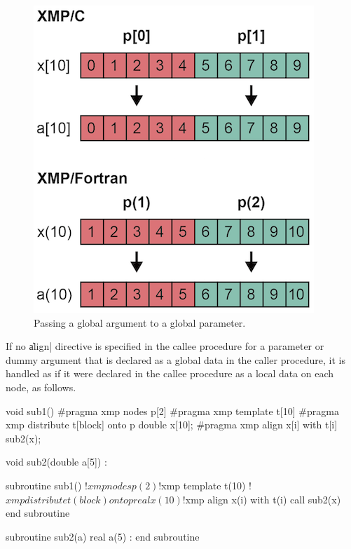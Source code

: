 \begin{figure}
  \centering
  \includegraphics{figs/destributed_array.png}
  \caption{Passing a global argument to a global parameter.}
\end{figure}


If no \|align| directive is specified in the callee procedure for a
parameter or dummy argument that is declared as a global data in the
caller procedure, it is handled as if it were declared in the callee
procedure as a local data on each node, as follows.

\begin{XCexample}
void sub1(){
#pragma xmp nodes p[2]
#pragma xmp template t[10]
#pragma xmp distribute t[block] onto p
  double x[10];
#pragma xmp align x[i] with t[i]
  sub2(x);
}

void sub2(double a[5]){
  :
}
\end{XCexample}

\begin{XFexample}
subroutine sub1()
!$xmp nodes p(2)
!$xmp template t(10)
!$xmp distribute t(block) onto p
  real x(10)
!$xmp align x(i) with t(i)
  call sub2(x)
end subroutine

subroutine sub2(a)
  real a(5)
  :
end subroutine
\end{XFexample}

